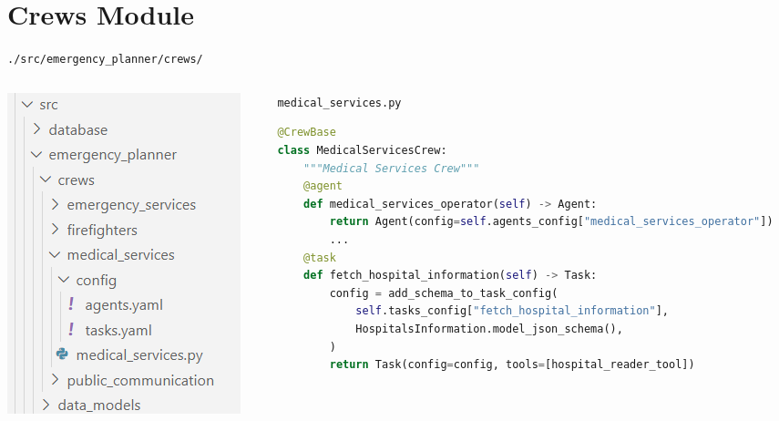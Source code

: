 \section*{Crews Module}
\begin{frame}[fragile]{\texttt{./src/emergency\_planner/crews/}}
    \begin{columns}[c]
      \begin{column}{0.3\textwidth}
          \includegraphics[width=\textwidth]{figures/crews_modules_folders.png}
      \end{column}
      \begin{column}{0.68\textwidth}
        \texttt{medical\_services.py}
        \begin{lstlisting}[language=Python, breaklines=true]
@CrewBase
class MedicalServicesCrew:
    """Medical Services Crew"""
    @agent
    def medical_services_operator(self) -> Agent:
        return Agent(config=self.agents_config["medical_services_operator"])
        ...
    @task
    def fetch_hospital_information(self) -> Task:
        config = add_schema_to_task_config(
            self.tasks_config["fetch_hospital_information"],
            HospitalsInformation.model_json_schema(),
        )
        return Task(config=config, tools=[hospital_reader_tool])
        \end{lstlisting}
      \end{column}
    \end{columns}
\end{frame}
